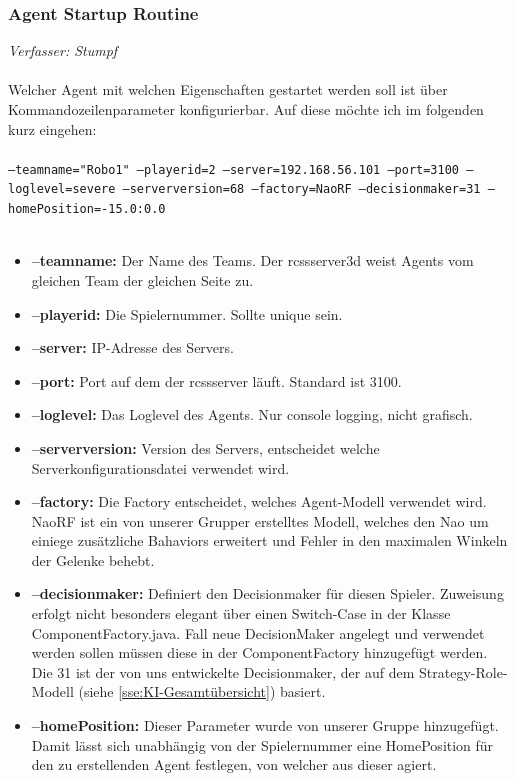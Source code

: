 \documentclass[fontsize=12pt,a4paper,final]{scrartcl}[2003/01/01]
\begin{document}
\subsubsection{Agent Startup Routine}
\label{subsec:Agent Startup Routine}
\textit{Verfasser: Stumpf}\\
\\
Welcher Agent mit welchen Eigenschaften gestartet werden soll ist über Kommandozeilenparameter konfigurierbar. Auf diese möchte ich im folgenden kurz eingehen:\\
\\
\texttt{--teamname="Robo1" --playerid=2 --server=192.168.56.101 --port=3100 --loglevel=severe --serverversion=68 --factory=NaoRF --decisionmaker=31 --homePosition=-15.0:0.0}\\
\\
\begin{itemize}
\item \textbf{--teamname:} Der Name des Teams. Der rcssserver3d weist Agents vom gleichen Team der gleichen Seite zu.
\item \textbf{--playerid:} Die Spielernummer. Sollte unique sein.
\item \textbf{--server:} IP-Adresse des Servers.
\item \textbf{--port:} Port auf dem der rcssserver läuft. Standard ist 3100.
\item \textbf{--loglevel:} Das Loglevel des Agents. Nur console logging, nicht grafisch.
\item \textbf{--serverversion:} Version des Servers, entscheidet welche Serverkonfigurationsdatei verwendet wird.
\item \textbf{--factory:} Die Factory entscheidet, welches Agent-Modell verwendet wird. NaoRF ist ein von unserer Grupper erstelltes Modell, welches den Nao um einiege zusätzliche Bahaviors erweitert und Fehler in den maximalen Winkeln der Gelenke behebt.
\item \textbf{--decisionmaker:} Definiert den Decisionmaker für diesen Spieler. Zuweisung erfolgt nicht besonders elegant über einen Switch-Case in der Klasse ComponentFactory.java. Fall neue DecisionMaker angelegt und verwendet werden sollen müssen diese in der ComponentFactory hinzugefügt werden. Die 31 ist der von uns entwickelte Decisionmaker, der auf dem Strategy-Role-Modell (siehe \autoref{sse:KI-Gesamtübersicht}) basiert.
\item \textbf{--homePosition:} Dieser Parameter wurde von unserer Gruppe hinzugefügt. Damit lässt sich unabhängig von der Spielernummer eine HomePosition für den zu erstellenden Agent festlegen, von welcher aus dieser agiert.
\end{itemize}
\end{document}
